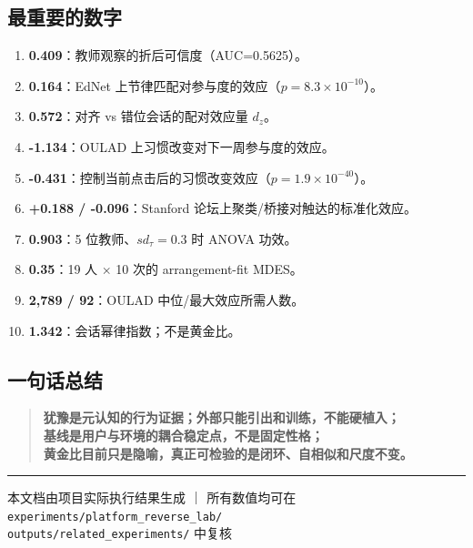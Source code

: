 \documentclass[UTF8,a4paper,11pt]{ctexart}
\begin{document}
\subsection{最重要的数字}

\begin{enumerate}[leftmargin=2em]
\item \textbf{0.409}：教师观察的折后可信度（AUC=0.5625）。
\item \textbf{0.164}：EdNet 上节律匹配对参与度的效应（$p=8.3\times10^{-10}$）。
\item \textbf{0.572}：对齐 vs 错位会话的配对效应量 $d_z$。
\item \textbf{-1.134}：OULAD 上习惯改变对下一周参与度的效应。
\item \textbf{-0.431}：控制当前点击后的习惯改变效应（$p=1.9\times10^{-40}$）。
\item \textbf{+0.188 / -0.096}：Stanford 论坛上聚类/桥接对触达的标准化效应。
\item \textbf{0.903}：5 位教师、$sd_\tau=0.3$ 时 ANOVA 功效。
\item \textbf{0.35}：19 人 $\times$ 10 次的 arrangement-fit MDES。
\item \textbf{2,789 / 92}：OULAD 中位/最大效应所需人数。
\item \textbf{1.342}：会话幂律指数；不是黄金比。
\end{enumerate}

\subsection{一句话总结}

\begin{quote}
\large
\textbf{犹豫是元认知的行为证据；外部只能引出和训练，不能硬植入；\\
基线是用户与环境的耦合稳定点，不是固定性格；\\
黄金比目前只是隐喻，真正可检验的是闭环、自相似和尺度不变。}
\end{quote}

\vspace{12pt}
\hrule
\vspace{6pt}
\begin{center}
\small 本文档由项目实际执行结果生成 ｜
所有数值均可在\\
\texttt{experiments/platform\_reverse\_lab/}\\
\texttt{outputs/related\_experiments/} 中复核
\end{center}
\end{document}
